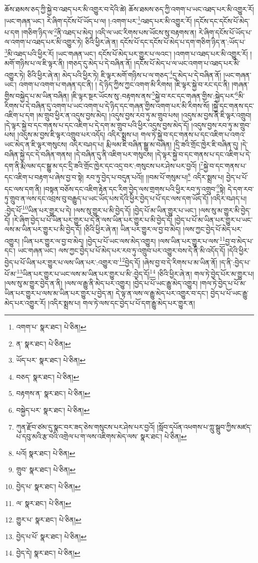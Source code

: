 ཆོས་ཐམས་ཅད་ཀྱི་སྐྱེ་བ་འཐད་པར་མི་འགྱུར་བ་དེའི་ཚེ། ཆོས་ཐམས་ཅད་ཀྱི་འགག་པ་ཡང་འཐད་པར་མི་འགྱུར་རོ། །ཡང་གཞན་ཡང་། རེ་ཞིག་དངོས་པོ་ཡོད་པ་ལ། །:འགག་པར་\footnote{འགག་པ་  སྣར་ཐང་།  པེ་ཅིན། }འཐད་པར་མི་འགྱུར་རོ། །དངོས་དང་དངོས་པོ་མེད་པ་དག །གཅིག་ཉིད་ལ་\footnote{ན་  སྣར་ཐང་།  པེ་ཅིན། }ནི་འཐད་པ་མེད། །འདི་ལ་ཡང་རིགས་པས་ཡོངས་སུ་བརྟགས་ན། རེ་ཞིག་དངོས་པོ་ཡོད་པ་ལ་འགག་པ་འཐད་པར་མི་འགྱུར་ཏེ། ཅིའི་ཕྱིར་ཞེ་ན། དངོས་པོ་དང་དངོས་པོ་མེད་པ་དག་གཅིག་ཉིད་ན་:ཡོད་པ་\footnote{ཡོད་པར་  སྣར་ཐང་།  པེ་ཅིན། }མི་འཐད་པའི་ཕྱིར་རོ། །ཡང་གཞན་ཡང་། དངོས་པོ་མེད་པར་གྱུར་པ་ལའང་། །འགག་པ་འཐད་པར་མི་འགྱུར་རོ། །མགོ་གཉིས་པ་ལ་ཇི་ལྟར་ནི། །གཅད་དུ་མེད་པ་དེ་བཞིན་ནོ། །དངོས་པོ་མེད་པ་ལ་ཡང་འགག་པ་འཐད་པར་མི་འགྱུར་ཏེ། ཅིའི་ཕྱིར་ཞེ་ན། མེད་པའི་ཕྱིར་ཏེ། ཇི་ལྟར་མགོ་གཉིས་པ་ལ་གཅད་\footnote{བཅད་  སྣར་ཐང་།  པེ་ཅིན། }དུ་མེད་པ་དེ་བཞིན་ནོ། །ཡང་གཞན་ཡང་། འགག་པ་འགག་པ་གཞན་དང་ནི། །
དེ་ཉིད་ཀྱིས་ཀྱང་འགག་མི་རིགས། །ཇི་ལྟར་སྐྱེ་བ་རང་དང་ནི། །གཞན་གྱིས་བསྐྱེད་པ་མ་ཡིན་བཞིན། །ཇི་ལྟར་སྔར་ཡོངས་སུ་:བརྟགས་ནས་\footnote{བརྟགས་ན་  སྣར་ཐང་།  པེ་ཅིན། }སྐྱེ་བ་རང་དང་གཞན་གྱིས་:སྐྱེད་པར་\footnote{བསྐྱེད་པར་  སྣར་ཐང་།  པེ་ཅིན། }མི་རིགས་པ་དེ་བཞིན་དུ་འགག་པ་ཡང་འགག་པ་དེ་ཉིད་དང་གཞན་གྱིས་འགག་པར་མི་རིགས་སོ། །སྐྱེ་དང་གནས་དང་འཇིག་པ་དག །མ་གྲུབ་ཕྱིར་ན་འདུས་བྱས་མེད། །འདུས་བྱས་རབ་ཏུ་མ་གྲུབ་པས། །འདུས་མ་བྱས་ནི་ཇི་ལྟར་འགྲུབ། །དེ་ལྟར་སྐྱེ་བ་དང་གནས་པ་དང་འཇིག་པ་དེ་དག་མ་གྲུབ་པའི་ཕྱིར་འདུས་བྱས་མེད་དོ། །འདུས་བྱས་རབ་ཏུ་མ་གྲུབ་པས། །འདུས་མ་བྱས་ཇི་ལྟར་འགྲུབ་པར་འདོད། འདིར་སྨྲས་པ། གལ་ཏེ་སྐྱེ་བ་དང་གནས་པ་དང་འཇིག་པ་འགའ་ཡང་མེད་ན་ཇི་ལྟར་གསུངས། འདིར་བཤད་པ། རྨི་ལམ་ཇི་བཞིན་སྒྱུ་མ་བཞིན། །དྲི་ཟའི་གྲོང་ཁྱེར་ཇི་བཞིན་དུ། །དེ་བཞིན་སྐྱེ་དང་དེ་བཞིན་གནས། །དེ་བཞིན་དུ་ནི་འཇིག་པར་གསུངས། །དེ་ལྟར་སྐྱེ་བ་དང་གནས་པ་དང་འཇིག་པ་དེ་དག་ནི་རྨི་ལམ་དང་སྒྱུ་མ་དང་དྲི་ཟའི་གྲོང་ཁྱེར་དང་འདྲ་བར་:གསུངས་པར་ཤེས་པར་བྱའོ། །\footnote{ཀུན་རྫོབ་ཙམ་དུ་སྣང་བར་ཟད་ཅེས་གསུངས་པར་ཤེས་པར་བྱའོ། །སློབ་དཔོན་འཕགས་པ་ཀླུ་སྒྲུབ་ཀྱིས་མཛད་པ་དབུ་མའི་རྩ་བའི་འགྲེལ་པ་ག་ལས་འཇིགས་མེད་ལས་  སྣར་ཐང་།  པེ་ཅིན། }སྐྱེ་བ་དང་གནས་པ་དང་འཇིག་པ་བརྟག་པ་ཞེས་བྱ་བ་སྟེ། རབ་ཏུ་བྱེད་པ་བདུན་པའོ།། །།བམ་པོ་གསུམ་པ།\footnote{པའོ།  སྣར་ཐང་།  པེ་ཅིན། } འདིར་སྨྲས་པ། བྱེད་པ་པོ་དང་ལས་དག་ནི། །བསྟན་བཅོས་དང་འཇིག་རྟེན་དང་རིག་བྱེད་ལས་གྲགས་པའི་ཕྱིར་རབ་ཏུ་འགྲུབ་\footnote{གྲུབ་  སྣར་ཐང་།  པེ་ཅིན། }སྟེ། དེ་དག་རབ་ཏུ་གྲུབ་ན་ལས་དང་འབྲས་བུ་བརྒྱུད་པ་ཡང་ཡོད་པས་དེའི་ཕྱིར་བྱེད་པ་པོ་དང་ལས་དག་ཡོད་དོ། །འདིར་བཤད་པ། :བྱེད་པོ་\footnote{བྱེད་པ་  སྣར་ཐང་།  པེ་ཅིན། }ཡིན་པར་གྱུར་པ་དེ། །ལས་སུ་གྱུར་པ་མི་བྱེད་དོ། །བྱེད་པོ་མ་ཡིན་གྱུར་པ་ཡང་། །ལས་སུ་མ་གྱུར་མི་བྱེད་དོ། །རེ་ཞིག་བྱེད་པ་པོ་ཡིན་པར་གྱུར་པ་དེ་ནི་ལས་ཡིན་པར་གྱུར་པ་མི་བྱེད་དོ། །བྱེད་པ་པོ་མ་ཡིན་པར་གྱུར་པ་ཡང་ལས་མ་ཡིན་པར་གྱུར་པ་མི་བྱེད་དོ། །ཅིའི་ཕྱིར་ཞེ་ན། ཡིན་པར་གྱུར་ལ་བྱ་བ་མེད། །ལས་ཀྱང་བྱེད་པོ་མེད་པར་འགྱུར། །ཡིན་པར་གྱུར་ལ་བྱ་བ་མེད། །བྱེད་པ་པོ་ཡང་ལས་མེད་འགྱུར། །ལས་ཡིན་པར་གྱུར་པ་ལས་\footnote{ལ་  སྣར་ཐང་།  པེ་ཅིན། }བྱ་བ་མེད་པ་དང་། ཡང་གཞན་ཡང་། ལས་ཀྱང་བྱེད་པ་པོ་མེད་པར་རབ་ཏུ་འགྲུབ་པར་འགྱུར་བས་དེ་ནི་མི་འདོད་དོ། །དེའི་ཕྱིར་བྱེད་པ་པོ་ཡིན་པར་གྱུར་པ་ལས་ཡིན་པར་:འགྱུར་བ་\footnote{གྱུར་པ་  སྣར་ཐང་།  པེ་ཅིན། }བྱེད་དོ། །ཞེས་བྱ་བ་དེ་རིགས་པ་མ་ཡིན་ནོ། །ད་ནི་:བྱེད་པ་པོ་མ་\footnote{བྱེད་པ་པོ་  སྣར་ཐང་།  པེ་ཅིན། }ཡིན་པར་གྱུར་པ་ཡང་ལས་མ་ཡིན་པར་གྱུར་པ་མི་:བྱེད་དོ།\footnote{བྱེད་དེ།  སྣར་ཐང་།  པེ་ཅིན། } །ཅིའི་ཕྱིར་ཞེ་ན། གལ་ཏེ་བྱེད་པོར་མ་གྱུར་པ། །ལས་སུ་མ་གྱུར་བྱེད་ན་ནི། །ལས་ལ་རྒྱུ་ནི་མེད་པར་འགྱུར། །བྱེད་པ་པོ་ཡང་རྒྱུ་མེད་འགྱུར། །གལ་ཏེ་བྱེད་པ་པོ་མ་ཡིན་པར་གྱུར་པ་ལས་མ་ཡིན་པར་གྱུར་པ་བྱེད་ན། དེ་ལྟ་ན་ལས་ལ་རྒྱུ་མེད་པར་འགྱུར་བ་དང་། བྱེད་པ་པོ་ཡང་རྒྱུ་མེད་པར་འགྱུར་རོ། །འདིར་སྨྲས་པ། གལ་ཏེ་ལས་དང་བྱེད་པ་པོ་དག་རྒྱུ་མེད་པར་གྱུར་ན། 
